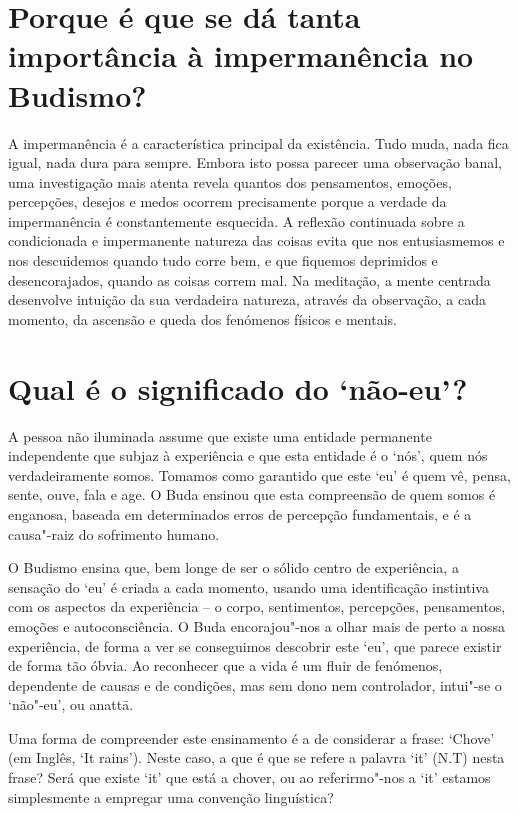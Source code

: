 \section{Porque é que se dá tanta importância à impermanência no Budismo?}

A impermanência é a característica principal da existência. Tudo muda,
nada fica igual, nada dura para sempre. Embora isto possa parecer uma
observação banal, uma investigação mais atenta revela quantos dos
pensamentos, emoções, percepções, desejos e medos ocorrem precisamente
porque a verdade da impermanência é constantemente esquecida. A reflexão
continuada sobre a condicionada e impermanente natureza das coisas evita
que nos entusiasmemos e nos descuidemos quando tudo corre bem, e que
fiquemos deprimidos e desencorajados, quando as coisas correm mal. Na
meditação, a mente centrada desenvolve intuição da sua verdadeira
natureza, através da observação, a cada momento, da ascensão e queda dos
fenómenos físicos e mentais.

\section{Qual é o significado do `não-eu'?}

A pessoa não iluminada assume que existe uma entidade permanente
independente que subjaz à experiência e que esta entidade é o `nós',
quem nós verdadeiramente somos. Tomamos como garantido que este `eu' é
quem vê, pensa, sente, ouve, fala e age. O Buda ensinou que esta
compreensão de quem somos é enganosa, baseada em determinados erros de
percepção fundamentais, e é a causa"-raiz do sofrimento humano.

O Budismo ensina que, bem longe de ser o sólido centro de experiência, a
sensação do `eu' é criada a cada momento, usando uma identificação
instintiva com os aspectos da experiência -- o corpo, sentimentos,
percepções, pensamentos, emoções e autoconsciência. O Buda
encorajou"-nos a olhar mais de perto a nossa experiência, de forma a ver
se conseguimos descobrir este `eu', que parece existir de forma tão
óbvia. Ao reconhecer que a vida é um fluir de fenómenos, dependente de
causas e de condições, mas sem dono nem controlador, intui"-se o
`não"-eu', ou anattā.

Uma forma de compreender este ensinamento é a de considerar a frase:
`Chove' (em Inglês, `It rains'). Neste caso, a que é que se refere a
palavra `it' (N.T) nesta frase? Será que existe `it' que está a chover,
ou ao referirmo"-nos a `it' estamos simplesmente a empregar uma convenção
linguística?

